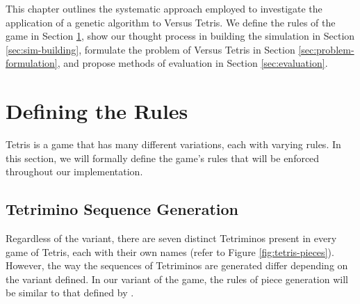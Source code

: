 \documentclass[a4paper, 12pt]{extreport}
\begin{document}
	This chapter outlines the systematic approach employed to investigate the application of a genetic algorithm to Versus Tetris. We define the rules of the game in Section \ref{sec:rules}, show our thought process in building the simulation in Section \ref{sec:sim-building}, formulate the problem of Versus Tetris in Section \ref{sec:problem-formulation}, and propose methods of evaluation in Section \ref{sec:evaluation}.
	
	\section{Defining the Rules}\label{sec:rules}
	Tetris is a game that has many different variations, each with varying rules. In this section, we will formally define the game's rules that will be enforced throughout our implementation.
	
	\subsection{Tetrimino Sequence Generation}
	
	Regardless of the variant, there are seven distinct Tetriminos present in every game of Tetris, each with their own names (refer to Figure \ref{fig:tetris-pieces}). However, the way the sequences of Tetriminos are generated differ depending on the variant defined. In our variant of the game, the rules of piece generation will be similar to that defined by \citeauthor{tetris-drl-2} \cite{tetris-drl-2}.
	
\end{document}

